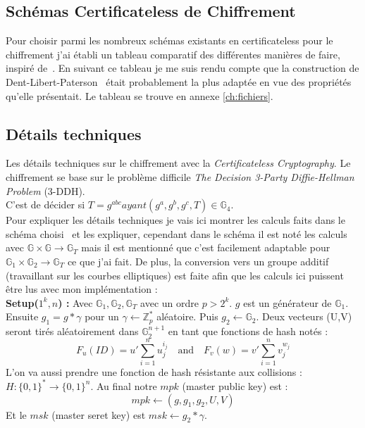 \subsection{Schémas Certificateless de Chiffrement}
Pour choisir parmi les nombreux schémas existants en certificateless pour le chiffrement j'ai établi un tableau comparatif des différentes manières de faire, inspiré de~\cite{bookIntroCertificateless}. En suivant ce tableau je me suis rendu compte que la construction de Dent-Libert-Paterson~\cite{DBLP:conf/pkc/DentLP08} était probablement la plus adaptée en vue des propriétés qu'elle présentait. Le tableau se trouve en annexe \ref{ch:fichiers}.

\subsection{Détails techniques}
Les détails techniques sur le chiffrement avec la \textit{Certificateless Cryptography}.
Le chiffrement se base sur le problème difficile \textit{The Decision 3-Party Diffie-Hellman Problem} (3-DDH). \\C'est de décider si $T =g^{abc} ayant (g^a, g^b, g^c, T) \in \mathbb{G}_4$.\\
Pour expliquer les détails techniques je vais ici montrer les calculs faits dans le schéma choisi~\cite{DBLP:conf/pkc/DentLP08} et les expliquer, cependant dans le schéma il est noté les calculs avec $\mathbb{G} \times \mathbb{G} \rightarrow \mathbb{G}_T$ mais il est mentionné que c'est facilement adaptable pour $\mathbb{G}_1 \times \mathbb{G}_2 \rightarrow \mathbb{G}_T$ ce que j'ai fait. De plus, la conversion vers un groupe additif (travaillant sur les courbes elliptiques) est faite afin que les calculs ici puissent être lus avec mon implémentation :\\
\textbf{Setup($1^k, n$) :} Avec $\mathbb{G}_1, \mathbb{G}_2, \mathbb{G}_T$ avec un ordre $p > 2^k$. $g$ est un générateur de $\mathbb{G}_1$. Ensuite  $g_1 = g * \gamma$ pour un $\gamma \leftarrow  \mathbb{Z}_p^*$ aléatoire. Puis $g_2 \leftarrow \mathbb{G}_2$. Deux vecteurs (U,V) seront tirés aléatoirement dans $\mathbb{G}_2^{n+1}$ en tant que fonctions de hash notés :
\[F_u(ID) = u' \sum_{i=1}^{n} u_j^{i_j}\quad\mathrm{and}\quad F_v(w) = v' \sum_{i=1}^{n} v_j^{w_j}\]
L'on va aussi prendre une fonction de hash résistante aux collisions : $H : \{0,1\}^* \rightarrow \{0,1\}^n$. Au final notre $mpk$ (master public key) est :
\[mpk \leftarrow (g, g_1, g_2, U, V)\]
Et le $msk$ (master seret key) est $msk \leftarrow g_2*\gamma$.\\
